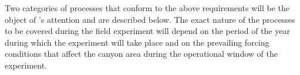  
Two categories of processes that conform to the above requirements
will be the object of \proje's attention and are described below. The
exact nature of the processes to be covered during the field
experiment will depend on the period of the year during which the
experiment will take place and on the prevailing forcing conditions
that affect the \naz canyon area during the operational window of the
experiment.

